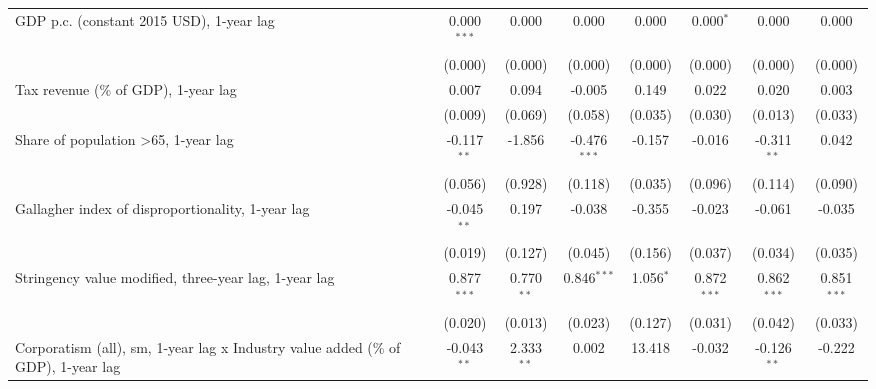 \begin{table}[htbp]
\begin{tabular}{lccccccc}
      GDP p.c. (constant 2015 USD), 1-year lag                                          & 0.000$^{***}$ & 0.000                     & 0.000          & 0.000            & 0.000$^{*}$     & 0.000           & 0.000\\   
                                                                                        & (0.000)       & (0.000)                   & (0.000)        & (0.000)          & (0.000)         & (0.000)         & (0.000)\\   
      Tax revenue (\% of GDP), 1-year lag                                               & 0.007         & 0.094                     & -0.005         & 0.149            & 0.022           & 0.020           & 0.003\\   
                                                                                        & (0.009)       & (0.069)                   & (0.058)        & (0.035)          & (0.030)         & (0.013)         & (0.033)\\   
      Share of population >65, 1-year lag                                               & -0.117$^{**}$ & -1.856                    & -0.476$^{***}$ & -0.157           & -0.016          & -0.311$^{**}$   & 0.042\\   
                                                                                        & (0.056)       & (0.928)                   & (0.118)        & (0.035)          & (0.096)         & (0.114)         & (0.090)\\   
      Gallagher index of disproportionality, 1-year lag                                 & -0.045$^{**}$ & 0.197                     & -0.038         & -0.355           & -0.023          & -0.061          & -0.035\\   
                                                                                        & (0.019)       & (0.127)                   & (0.045)        & (0.156)          & (0.037)         & (0.034)         & (0.035)\\   
      Stringency value modified, three-year lag, 1-year lag                             & 0.877$^{***}$ & 0.770$^{**}$              & 0.846$^{***}$  & 1.056$^{*}$      & 0.872$^{***}$   & 0.862$^{***}$   & 0.851$^{***}$\\   
                                                                                        & (0.020)       & (0.013)                   & (0.023)        & (0.127)          & (0.031)         & (0.042)         & (0.033)\\   
      Corporatism (all), sm, 1-year lag x Industry value added (\% of GDP), 1-year lag  & -0.043$^{**}$ & 2.333$^{**}$              & 0.002          & 13.418           & -0.032          & -0.126$^{**}$   & -0.222\\   

\end{tabular}
\end{table}
